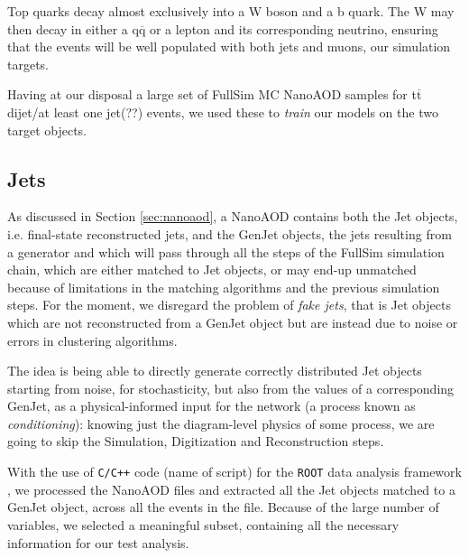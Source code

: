 Top quarks decay almost exclusively into a W boson and a b quark. The W may then decay in either a q$\overline{\text{q}}$ or a lepton and its corresponding neutrino, ensuring that the events will be well populated with both jets and muons, our simulation targets. 


Having at our disposal a large set of FullSim MC NanoAOD samples for t$\overline{\text{t}}$ dijet/at least one jet(??) events, we used these to \emph{train} our models on the two target objects.

\subsection{Jets}

As discussed in Section \ref{sec:nanoaod}, a NanoAOD contains both the Jet objects, i.e. final-state reconstructed jets, and the GenJet objects, the jets resulting from a generator and which will pass through all the steps of the FullSim simulation chain, which are either matched to Jet objects, or may end-up unmatched because of limitations in the matching algorithms and the previous simulation steps. For the moment, we disregard the problem of \emph{fake jets}, that is Jet objects which are not reconstructed from a GenJet object but are instead due to noise or errors in clustering algorithms.

The idea is being able to directly generate correctly distributed Jet objects starting from noise, for stochasticity,  but also from the values of a corresponding GenJet, as a physical-informed input for the network (a process known as \emph{conditioning}): knowing just the diagram-level physics of some process, we are going to skip the Simulation, Digitization and Reconstruction steps.


With the use of \texttt{C/C++} code (name of script) for the \texttt{ROOT} data analysis framework \cite{Brun:491486}, we processed the NanoAOD files and extracted all the Jet objects matched to a GenJet object, across all the events in the file. Because of the large number of variables, we selected a meaningful subset, containing all the necessary information for our test analysis.

